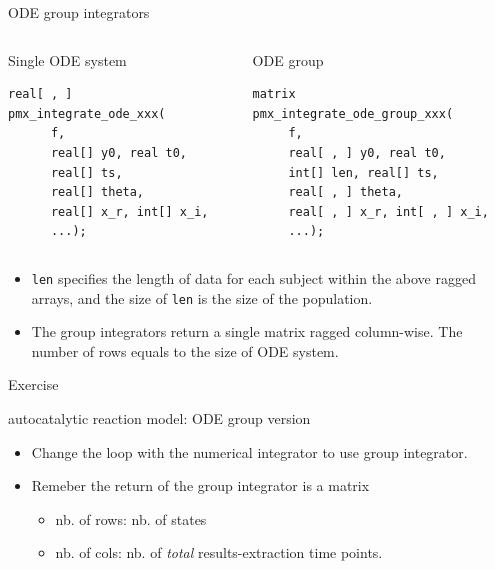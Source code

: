 \documentclass[presentation, allowframebreaks]{beamer}
\begin{document}
\begin{frame}[fragile,label={sec:org6fc3a8b}]{ODE group integrators}
 \begin{columns}
\begin{column}{0.45\columnwidth}
\begin{block}{Single ODE system}
\begin{verbatim}
real[ , ]
pmx_integrate_ode_xxx(
      f,
      real[] y0, real t0,
      real[] ts,
      real[] theta,
      real[] x_r, int[] x_i,
      ...);
\end{verbatim}
\end{block}
\end{column}

\begin{column}{0.55\columnwidth}
\begin{block}{ODE group}
\begin{verbatim}
matrix
pmx_integrate_ode_group_xxx(
     f,
     real[ , ] y0, real t0,
     int[] len, real[] ts,
     real[ , ] theta,
     real[ , ] x_r, int[ , ] x_i,
     ...);
\end{verbatim}
\end{block}
\end{column}
\end{columns}
\begin{block}{}
\begin{itemize}
\item \texttt{len} specifies the length of data for each subject within
the above ragged arrays, and the size of \texttt{len} is the size
of the population.
\item The group integrators return a single matrix ragged
column-wise. The number of rows equals to the size of ODE system.
\end{itemize}
\end{block}
\end{frame}

\begin{frame}[label={sec:orgd9d2650}]{Exercise}
\begin{block}{autocatalytic reaction model: ODE group version}
\begin{itemize}
\item Change the loop with the numerical integrator to use group
integrator.
\item Remeber the return of the group integrator is a matrix
\begin{itemize}
\item nb. of rows: nb. of states
\item nb. of cols: nb. of \emph{total} results-extraction time points.
\end{itemize}
\end{itemize}
\end{block}
\end{frame}
\end{document}
